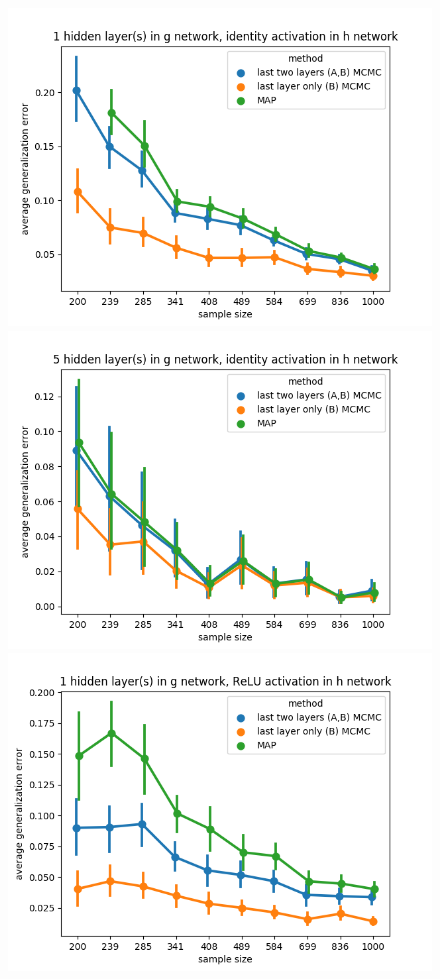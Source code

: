 \documentclass{article} %
\begin{document}
\newpage
\begin{figure}[t!]
	\begin{center}
		\includegraphics[scale=0.4]{taskid12.png}
		\includegraphics[scale=0.4]{taskid13.png}
		\includegraphics[scale=0.4]{taskid14.png}

\end{center}
\end{figure}
\end{document}
